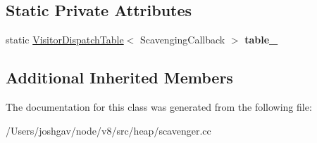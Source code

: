 \subsection*{Static Private Attributes}
\begin{DoxyCompactItemize}
\item 
static \hyperlink{classv8_1_1internal_1_1_visitor_dispatch_table}{Visitor\+Dispatch\+Table}$<$ Scavenging\+Callback $>$ {\bfseries table\+\_\+}\hypertarget{classv8_1_1internal_1_1_scavenging_visitor_a69c4bced8f1c6effc4abf4234594372b}{}\label{classv8_1_1internal_1_1_scavenging_visitor_a69c4bced8f1c6effc4abf4234594372b}

\end{DoxyCompactItemize}
\subsection*{Additional Inherited Members}


The documentation for this class was generated from the following file\+:\begin{DoxyCompactItemize}
\item 
/\+Users/joshgav/node/v8/src/heap/scavenger.\+cc\end{DoxyCompactItemize}
